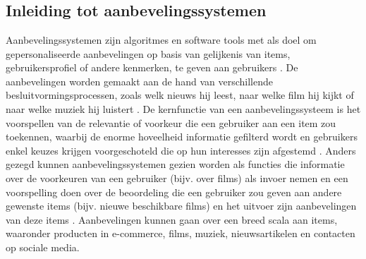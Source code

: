 \chapter{}%
\label{ch:stand-van-zaken}



\section{Inleiding tot aanbevelingssystemen}
Aanbevelingssystemen zijn algoritmes en software tools met als doel om gepersonaliseerde aanbevelingen op basis van gelijkenis van items, gebruikersprofiel of andere kenmerken, te geven aan gebruikers \autocite{Patel2020, Patel2023}. De aanbevelingen worden gemaakt aan de hand van verschillende besluitvormingsprocessen, zoals welk nieuws hij leest, naar welke film hij kijkt of naar welke muziek hij luistert \autocite{Patel2017}. De kernfunctie van een aanbevelingssysteem is het voorspellen van de relevantie of voorkeur die een gebruiker aan een item zou toekennen, waarbij de enorme hoveelheid informatie gefilterd wordt en gebruikers enkel keuzes krijgen voorgeschoteld die op hun interesses zijn afgestemd \autocite{Fkih2022}. Anders gezegd kunnen aanbevelingssystemen gezien worden als functies die informatie over de voorkeuren van een gebruiker (bijv. over films) als invoer nemen en een voorspelling doen over de beoordeling die een gebruiker zou geven aan andere gewenste items (bijv. nieuwe beschikbare films) en het uitvoer zijn aanbevelingen van deze items \autocite{Milano2020}. Aanbevelingen kunnen gaan over een breed scala aan items, waaronder producten in e-commerce, films, muziek, nieuwsartikelen en contacten op sociale media.
